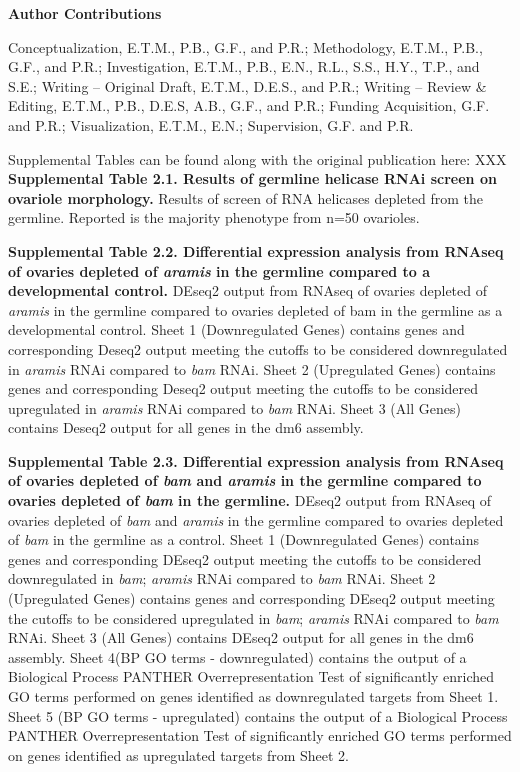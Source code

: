 \documentclass[12pt,oneside]{reedthesis}
\begin{document}
\textbf{Author Contributions}

Conceptualization, E.T.M., P.B., G.F., and P.R.; Methodology, E.T.M., P.B., G.F., and P.R.; Investigation, E.T.M., P.B., E.N., R.L., S.S., H.Y., T.P., and S.E.; Writing -- Original Draft, E.T.M., D.E.S., and P.R.; Writing -- Review \& Editing, E.T.M., P.B., D.E.S, A.B., G.F., and P.R.; Funding Acquisition, G.F. and P.R.; Visualization, E.T.M., E.N.; Supervision, G.F. and P.R.

\textbf{\hfill\break
}

Supplemental Tables can be found along with the original publication here: XXX\\

\textbf{Supplemental Table 2.1. Results of germline helicase RNAi screen on ovariole morphology.}
Results of screen of RNA helicases depleted from the germline. Reported is the majority phenotype from n=50 ovarioles.

\textbf{\hfill\break
}

\textbf{Supplemental Table 2.2. Differential expression analysis from RNAseq of ovaries depleted of \emph{aramis} in the germline compared to a developmental control.}
DEseq2 output from RNAseq of ovaries depleted of \emph{aramis} in the germline compared to ovaries depleted of bam in the germline as a developmental control. Sheet 1 (Downregulated Genes) contains genes and corresponding Deseq2 output meeting the cutoffs to be considered downregulated in \emph{aramis} RNAi compared to \emph{bam} RNAi. Sheet 2 (Upregulated Genes) contains genes and corresponding Deseq2 output meeting the cutoffs to be considered upregulated in \emph{aramis} RNAi compared to \emph{bam} RNAi. Sheet 3 (All Genes) contains Deseq2 output for all genes in the dm6 assembly.

\textbf{\hfill\break
}

\textbf{Supplemental Table 2.3. Differential expression analysis from RNAseq of ovaries depleted of \emph{bam} and \emph{aramis} in the germline compared to ovaries depleted of \emph{bam} in the germline.}
DEseq2 output from RNAseq of ovaries depleted of \emph{bam} and \emph{aramis} in the germline compared to ovaries depleted of \emph{bam} in the germline as a control. Sheet 1 (Downregulated Genes) contains genes and corresponding DEseq2 output meeting the cutoffs to be considered downregulated in \emph{bam}; \emph{aramis} RNAi compared to \emph{bam} RNAi. Sheet 2 (Upregulated Genes) contains genes and corresponding DEseq2 output meeting the cutoffs to be considered upregulated in \emph{bam}; \emph{aramis} RNAi compared to \emph{bam} RNAi. Sheet 3 (All Genes) contains DEseq2 output for all genes in the dm6 assembly. Sheet 4(BP GO terms - downregulated) contains the output of a Biological Process PANTHER Overrepresentation Test of significantly enriched GO terms performed on genes identified as downregulated targets from Sheet 1. Sheet 5 (BP GO terms - upregulated) contains the output of a Biological Process PANTHER Overrepresentation Test of significantly enriched GO terms performed on genes identified as upregulated targets from Sheet 2.
\end{document}
